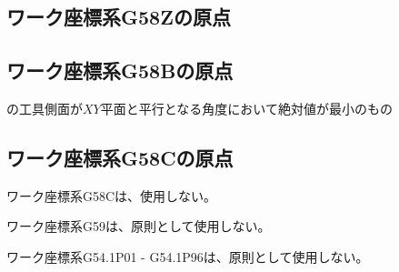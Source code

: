 \subsection{ワーク座標系{\ttfamily G58Z}の原点\TBW}


\subsection{ワーク座標系{\ttfamily G58B}の原点}
\Jig の工具側面が$XY$平面と平行となる角度において絶対値が最小のもの


\subsection{ワーク座標系{\ttfamily G58C}の原点}
ワーク座標系{\ttfamily G58C}は、使用しない。



\clearpage
ワーク座標系{\ttfamily G59}は、原則として使用しない。



ワーク座標系{\ttfamily G54.1\;P01} - {\ttfamily G54.1\;P96}は、原則として使用しない。


